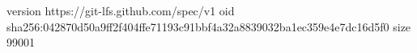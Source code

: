 version https://git-lfs.github.com/spec/v1
oid sha256:042870d50a9ff2f404ffe71193c91bbf4a32a8839032ba1ec359e4e7dc16d5f0
size 99001
